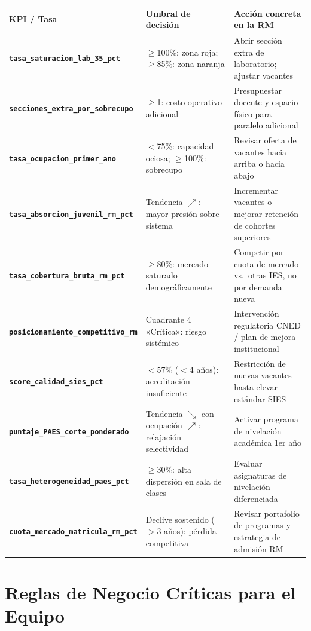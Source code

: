 \documentclass[11pt,a4paper]{article}
\begin{document}
\begin{center}\small
\begin{tabularx}{\textwidth}{@{}>{\bfseries}p{4.3cm}YY@{}}
\toprule
\textbf{KPI / Tasa} & \textbf{Umbral de decisión} & \textbf{Acción concreta en la RM} \\
\midrule
\texttt{tasa\_saturacion\_lab\_35\_pct} &
  $\geq$100\%: zona roja; $\geq$85\%: zona naranja &
  Abrir sección extra de laboratorio; ajustar vacantes \\
\texttt{secciones\_extra\_por\_sobrecupo} &
  $\geq$1: costo operativo adicional &
  Presupuestar docente y espacio físico para paralelo adicional \\
\texttt{tasa\_ocupacion\_primer\_ano} &
  $<$75\%: capacidad ociosa; $\geq$100\%: sobrecupo &
  Revisar oferta de vacantes hacia arriba o hacia abajo \\
\texttt{tasa\_absorcion\_juvenil\_rm\_pct} &
  Tendencia $\nearrow$: mayor presión sobre sistema &
  Incrementar vacantes o mejorar retención de cohortes superiores \\
\texttt{tasa\_cobertura\_bruta\_rm\_pct} &
  $\geq$80\%: mercado saturado demográficamente &
  Competir por cuota de mercado vs.\ otras IES, no por demanda nueva \\
\texttt{posicionamiento\_competitivo\_rm} &
  Cuadrante 4 «Crítica»: riesgo sistémico &
  Intervención regulatoria CNED / plan de mejora institucional \\
\texttt{score\_calidad\_sies\_pct} &
  $<$57\% ($<$4 años): acreditación insuficiente &
  Restricción de nuevas vacantes hasta elevar estándar SIES \\
\texttt{puntaje\_PAES\_corte\_ponderado} &
  Tendencia $\searrow$ con ocupación $\nearrow$: relajación selectividad &
  Activar programa de nivelación académica 1er año \\
\texttt{tasa\_heterogeneidad\_paes\_pct} &
  $\geq$30\%: alta dispersión en sala de clases &
  Evaluar asignaturas de nivelación diferenciada \\
\texttt{cuota\_mercado\_matricula\_rm\_pct} &
  Declive sostenido ($>$3 años): pérdida competitiva &
  Revisar portafolio de programas y estrategia de admisión RM \\
\bottomrule
\end{tabularx}
\end{center}

\section{Reglas de Negocio Críticas para el Equipo}
\label{sec:reglas}
\end{document}
